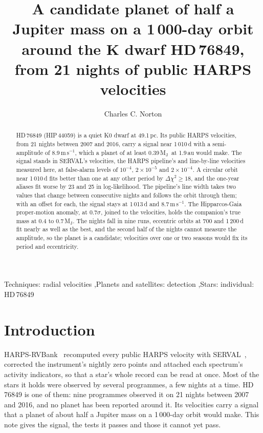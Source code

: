 \documentclass[3p,11pt]{elsarticle}
\newcommand{\ms}{m\,s$^{-1}$}
\newcommand{\Mjup}{M$_\mathrm{J}$}
\begin{document}
\begin{frontmatter}

\title{A candidate planet of half a Jupiter mass on a 1\,000-day orbit around the K dwarf HD\,76849,
from 21 nights of public HARPS velocities}

\author{Charles C. Norton}

\begin{abstract}
HD\,76849 (HIP\,44059) is a quiet K0 dwarf at 49.1\,pc. Its public HARPS velocities, from 21 nights
between 2007 and 2016, carry a signal near 1\,010\,d with a semi-amplitude of 8.9\,\ms, which a planet
of at least 0.39\,\Mjup\ at 1.9\,au would make. The signal stands in SERVAL's velocities, the HARPS
pipeline's and line-by-line velocities measured here, at false-alarm levels of $10^{-4}$,
$2\times10^{-5}$ and $2\times10^{-4}$. A circular orbit near 1\,010\,d fits better than one at any other
period by $\Delta\chi^2 \geq 18$, and the one-year aliases fit worse by 23 and 25 in log-likelihood.
The pipeline's line width takes two values that change between consecutive nights and follows the
orbit through them; with an offset for each, the signal stays at 1\,013\,d and 8.7\,\ms. The
Hipparcos-Gaia proper-motion anomaly, at $0.7\sigma$, joined to the velocities, holds the companion's
true mass at 0.4 to 0.7\,\Mjup. The nights fall in nine runs, eccentric orbits at 700 and 1\,200\,d
fit nearly as well as the best, and the second half of the nights cannot measure the amplitude, so the
planet is a candidate; velocities over one or two seasons would fix its period and eccentricity.
\end{abstract}

\begin{keyword}
Techniques: radial velocities \sep Planets and satellites: detection \sep Stars: individual: HD\,76849
\end{keyword}

\end{frontmatter}

\section{Introduction}\label{sec:intro}

HARPS-RVBank~\cite{Trifonov2020} recomputed every public HARPS velocity with
SERVAL~\cite{Zechmeister2018}, corrected the instrument's nightly zero points and attached each
spectrum's activity indicators, so that a star's whole record can be read at once. Most of the stars
it holds were observed by several programmes, a few nights at a time. HD\,76849 is one of them: nine
programmes observed it on 21 nights between 2007 and 2016, and no planet has been reported around it.
Its velocities carry a signal that a planet of about half a Jupiter mass on a 1\,000-day orbit would
make. This note gives the signal, the tests it passes and those it cannot yet pass.
\end{document}
